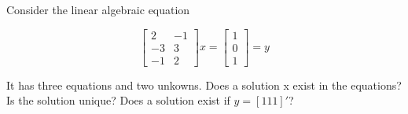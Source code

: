 \item [3.7] Consider the linear algebraic equation

\begin{equation*}
 \begin{bmatrix}
  2 & -1\\
  -3 & 3\\
  -1 & 2
 \end{bmatrix}
x =
\begin{bmatrix}
 1\\
 0\\
 1
\end{bmatrix}
= y
\end{equation*}

It has three equations and two unkowns.
Does a solution x exist in the equations?
Is the solution unique?
Does a solution exist if $y = [1 1 1]'$?
